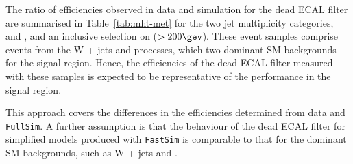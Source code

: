 The ratio of efficiencies observed in data and simulation for the dead
ECAL filter are summarised in Table~\ref{tab:mht-met} for the two jet
multiplicity categories, \njetlow and \njethigh, and an inclusive
selection on \scalht ($>200\gev$). These event samples comprise events
from the W + jets and \ttbar processes, which two dominant SM
backgrounds for the signal region. Hence, the efficiencies of the dead
ECAL filter measured with these samples is expected to be
representative of the performance in the signal region.



This approach covers the differences in the efficiencies determined
from data and \verb!FullSim!. A further assumption is that the
behaviour of the dead ECAL filter for simplified models produced with
\verb!FastSim! is comparable to that for the dominant SM backgrounds,
such as W + jets and \ttbar.

